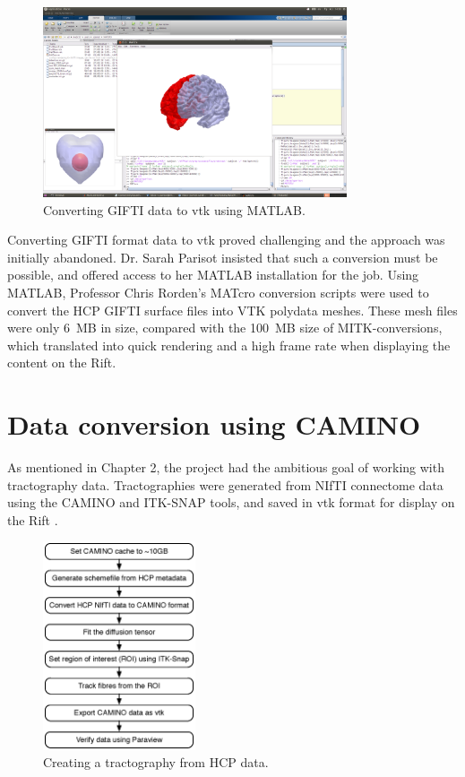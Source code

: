 \documentclass[MSc,paper=a4,pagesize=auto]{icldt}
\begin{document}
\begin{figure}[htbp!]
    \centering
    \includegraphics[width=0.8\textwidth]{resources/MATLAB_conversion}
    \caption{Converting GIFTI data to vtk using MATLAB.}
    \label{fig:MATLAB_conversion}
\end{figure}

Converting GIFTI format data to vtk proved challenging and the approach was initially abandoned. Dr. Sarah Parisot insisted that such a conversion must be possible, and offered access to her MATLAB installation for the job. Using MATLAB, Professor Chris Rorden's MATcro conversion scripts were used to convert the HCP GIFTI surface files into VTK polydata meshes. These mesh files were only \SI{6}{MB} in size, compared with the \SI{100}{MB} size of MITK-conversions, which translated into quick rendering and a high frame rate when displaying the content on the Rift.

\section{Data conversion using CAMINO}
As mentioned in Chapter 2, the project had the ambitious goal of working with tractography data. Tractographies were generated from NIfTI connectome data using the CAMINO and ITK-SNAP tools, and saved in vtk format for display on the Rift .

\begin{figure}[htbp!]
    \centering
    \includegraphics[width=0.4\textwidth]{resources/camino_process}
    \caption{Creating a tractography from HCP data.}
    \label{fig:camino_process}
\end{figure}
\end{document}
